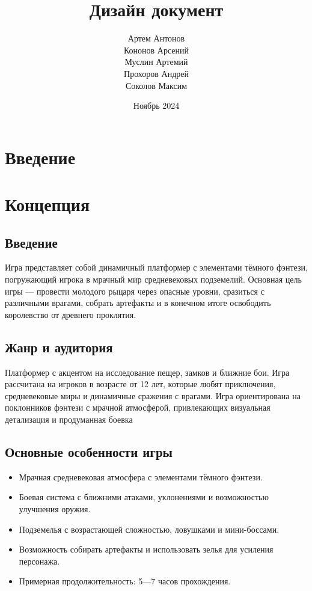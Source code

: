 \documentclass{article}
\title{Дизайн документ}
\author{Артем Антонов \\ Кононов Арсений  \\ Муслин Артемий \\ Прохоров Андрей \\ Соколов Максим}
\date{Ноябрь 2024}
\begin{document}
\maketitle

\tableofcontents
\newpage
\section{Введение}

\section{Концепция}

\subsection{Введение}
Игра представляет собой динамичный платформер с элементами тёмного фэнтези, погружающий игрока в мрачный мир средневековых подземелий. Основная цель игры — провести молодого рыцаря через опасные уровни, сразиться с различными врагами, собрать артефакты и в конечном итоге освободить королевство от древнего проклятия.

\subsection{Жанр и аудитория}
Платформер с акцентом на исследование пещер, замков и ближние бои. Игра рассчитана на игроков в возрасте от 12 лет, которые любят приключения, средневековые миры и динамичные сражения с врагами. Игра ориентирована на поклонников фэнтези с мрачной атмосферой, привлекающих визуальная детализация и продуманная боевка

\subsection{Основные особенности игры}
\begin{itemize}
    \item Мрачная средневековая атмосфера с элементами тёмного фэнтези.
    \item Боевая система с ближними атаками, уклонениями и возможностью улучшения оружия.
    \item Подземелья с возрастающей сложностью, ловушками и мини-боссами.
    \item Возможность собирать артефакты и использовать зелья для усиления персонажа.
    \item Примерная продолжительность: 5—7 часов прохождения.
\end{itemize}
\end{document}
